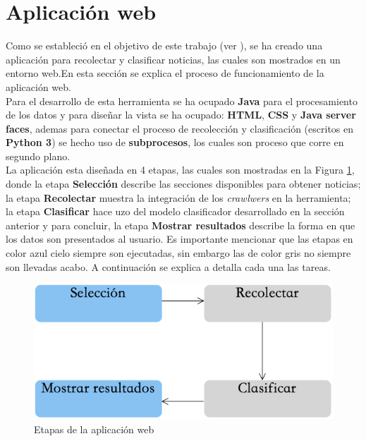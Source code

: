 \section[Aplicación]{Aplicación web}


Como se estableció en el objetivo de este trabajo (ver ), se ha creado una aplicación para recolectar y clasificar noticias, las cuales son mostrados en un entorno web.En esta sección se explica el proceso de funcionamiento de la aplicación web.\\

Para el desarrollo de esta  herramienta se ha ocupado \textbf{Java} para el procesamiento de los datos y para diseñar la vista se ha ocupado: \textbf{HTML}, \textbf{CSS} y \textbf{Java server faces}, ademas para conectar el proceso de recolección y clasificación (escritos en \textbf{Python 3}) se hecho uso de \textbf{subprocesos}, los cuales son proceso que corre en segundo plano.\\

La aplicación esta diseñada en 4 etapas, las cuales son mostradas en la Figura \ref{fig:procesoAppWeb}, donde la etapa \textbf{Selección} describe las secciones disponibles para obtener noticias; la etapa \textbf{Recolectar} muestra la integración de los \textit{crawlwers} en la herramienta; la etapa \textbf{Clasificar} hace uzo del modelo clasificador desarrollado en la sección anterior y para concluir, la etapa \textbf{Mostrar resultados} describe la forma en que los datos son presentados al usuario. Es importante mencionar que las etapas en color azul cielo siempre son ejecutadas, sin embargo las de color gris no siempre son llevadas acabo. A continuación se explica a detalla cada una las tareas.


\begin{figure}[H]
	\centering
	\includegraphics[scale=0.55]{imagenes/Capitulo5/AplicacionWeb/ProcesoAplicacionWeb.png}
	\caption{Etapas de la aplicación web}
	\label{fig:procesoAppWeb}
\end{figure}

